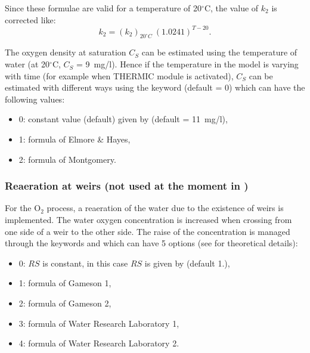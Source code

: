 
Since these formulae are valid for a temperature of 20$^\circ$C,
the value of $k_2$ is corrected like:
\begin{equation*}
  k_2 = \left( k_2 \right)_{20^\circ C}\ \left( 1.0241 \right)^{T-20}.
\end{equation*}


The oxygen density at saturation $C_S$ can be estimated
using the temperature of water (at 20$^\circ$C, $C_S$ = 9~mg/l).
Hence if the temperature in the model is varying with time
(for example when THERMIC module is activated),
$C_S$ can be estimated with different ways using the keyword
 (default = 0) which can have the following values:

\begin{itemize}
\item 0: constant value (default) given by
   (default = 11~mg/l),
\item 1: formula of Elmore \& Hayes,
\item  2: formula of Montgomery.
\end{itemize}

\subsubsection{Reaeration at weirs (not used at the moment in \waqtel)}
For the O$_2$ process, a reaeration of the water due to the existence of weirs is implemented.
The water oxygen concentration is increased when crossing
from one side of a weir to the other side.
The raise of the concentration is managed through the keywords
 and 
which can have 5 options (see \cite{El-Kadi2012} for theoretical details):

\begin{itemize}
\item 0: $RS$ is constant, in this case $RS$ is given by
   (default 1.),
\item 1: formula of Gameson 1,
\item 2: formula of Gameson 2,
\item 3: formula of Water Research Laboratory 1,
\item 4: formula of Water Research Laboratory 2.
\end{itemize}


